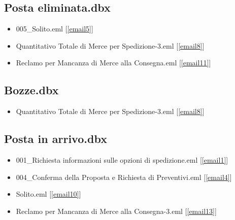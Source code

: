 \subsection{Posta eliminata.dbx}
\begin{itemize}
    \item 005\_Solito.eml [\ref{email5}]
    \item Quantitativo Totale di Merce per Spedizione-3.eml [\ref{email8}]
    \item Reclamo per Mancanza di Merce alla Consegna.eml [\ref{email11}]
\end{itemize}

\subsection{Bozze.dbx}
\begin{itemize}
    \item Quantitativo Totale di Merce per Spedizione-3.eml [\ref{email8}]
\end{itemize}

\subsection{Posta in arrivo.dbx}
\begin{itemize}
    \item 001\_Richiesta informazioni sulle opzioni di spedizione.eml [\ref{email1}]
    \item 004\_Conferma della Proposta e Richiesta di Preventivi.eml [\ref{email4}]
    \item Solito.eml [\ref{email10}]
    \item Reclamo per Mancanza di Merce alla Consegna-3.eml [\ref{email13}]
\end{itemize}